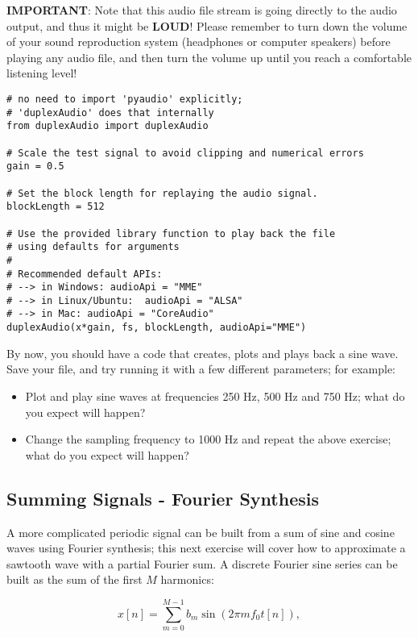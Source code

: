 \textbf{IMPORTANT}: Note that this audio file stream is going directly to the audio output, and thus it might be \textbf{LOUD}! Please remember to turn down the volume of your sound reproduction system (headphones or computer speakers) before playing any audio file, and then turn the volume up until you reach a comfortable listening level!

\begin{lstlisting}[frame=single]
# no need to import 'pyaudio' explicitly;
# 'duplexAudio' does that internally
from duplexAudio import duplexAudio

# Scale the test signal to avoid clipping and numerical errors
gain = 0.5

# Set the block length for replaying the audio signal.
blockLength = 512

# Use the provided library function to play back the file
# using defaults for arguments
#
# Recommended default APIs:
# --> in Windows: audioApi = "MME"
# --> in Linux/Ubuntu:  audioApi = "ALSA"
# --> in Mac: audioApi = "CoreAudio"
duplexAudio(x*gain, fs, blockLength, audioApi="MME")
\end{lstlisting}

By now, you should have a code that creates, plots and plays back a sine wave. Save your file, and try running it with a few different parameters; for example:

\begin{itemize}
	\item Plot and play sine waves at frequencies 250 Hz, 500 Hz and 750 Hz; what do you expect will happen?
	\item Change the sampling frequency to 1000 Hz and repeat the above exercise; what do you expect will happen?
\end{itemize}


\subsection{Summing Signals - Fourier Synthesis}

A more complicated periodic signal can be built from a sum of sine and cosine waves using Fourier synthesis; this next exercise will cover how to approximate a sawtooth wave with a partial Fourier sum. A discrete Fourier sine series can be built as the sum of the first $M$ harmonics:

\begin{equation}
	x[n] = \sum_{m=0}^{M-1} b_m \sin(2 \pi m f_0 t[n]),
\end{equation}

